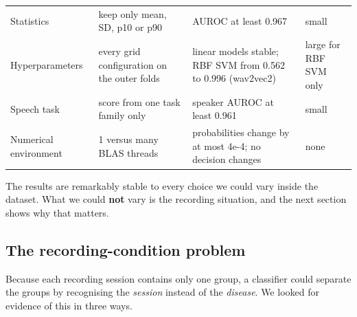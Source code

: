 \documentclass[11pt,a4paper]{article}
\begin{document}
\begin{center}
\begin{longtable}{>{\raggedright\arraybackslash}p{2.66cm}>{\raggedright\arraybackslash}p{4.18cm}>{\raggedright\arraybackslash}p{5.70cm}>{\raggedright\arraybackslash}p{2.28cm}}
\hspace{0pt}Statistics & \hspace{0pt}keep only mean, SD, p10 or p90 & \hspace{0pt}AUROC at least 0.967 & \hspace{0pt}small\\
\hspace{0pt}Hyperparameters & \hspace{0pt}every grid configuration on the outer folds & \hspace{0pt}linear models stable; RBF SVM from 0.562 to 0.996 (wav2vec2) & \hspace{0pt}large for RBF SVM only\\
\hspace{0pt}Speech task & \hspace{0pt}score from one task family only & \hspace{0pt}speaker AUROC at least 0.961 & \hspace{0pt}small\\
\hspace{0pt}Numerical environment & \hspace{0pt}1 versus many BLAS threads & \hspace{0pt}probabilities change by at most 4e-4; no decision changes & \hspace{0pt}none\\
\end{longtable}\end{center}
The results are remarkably stable to every choice we could vary inside the dataset. What we could \textbf{not} vary is the recording situation, and the next section shows why that matters.

\subsection{The recording-condition problem}\label{sec:confound}
Because each recording session contains only one group, a classifier could separate the groups by recognising the \emph{session} instead of the \emph{disease}. We looked for evidence of this in three ways.
\end{document}
